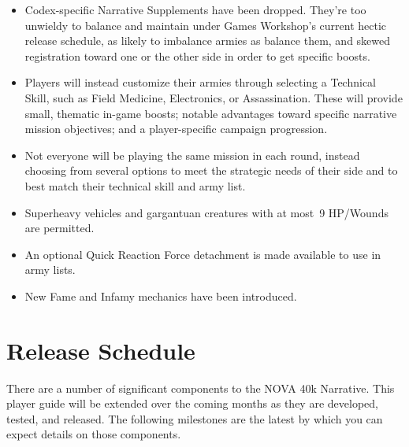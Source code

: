 \begin{itemize}


\item Codex-specific Narrative Supplements have been dropped.  They're
  too unwieldy to balance and maintain under Games Workshop's current
  hectic release schedule, as likely to imbalance armies as balance
  them, and skewed registration toward one or the other side in order
  to get specific boosts.

\item Players will instead customize their armies through selecting a
  Technical Skill, such as Field Medicine, Electronics, or
  Assassination.  These will provide small, thematic in-game boosts;
  notable advantages toward specific narrative mission objectives; and
  a player-specific campaign progression.

\item Not everyone will be playing the same mission in each round,
  instead choosing from several options to meet the strategic needs of
  their side and to best match their technical skill and army list.

\item Superheavy vehicles and gargantuan creatures with at most~9
  HP/Wounds are permitted.

\item An optional Quick Reaction Force detachment is made available to
  use in army lists.

\item New Fame and Infamy mechanics have been introduced.
\end{itemize}

\section{Release Schedule}

There are a number of significant components to the NOVA 40k
Narrative.  This player guide will be extended over the coming months
as they are developed, tested, and released.  The following milestones
are the latest by which you can expect details on those components.

